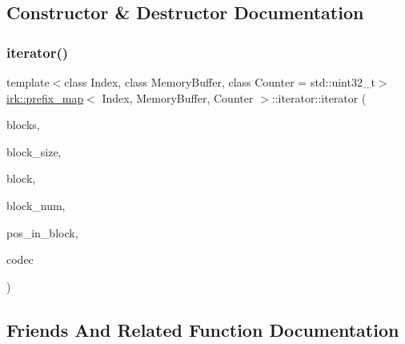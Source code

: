 \subsection{Constructor \& Destructor Documentation}
\mbox{\label{classirk_1_1prefix__map_1_1iterator_a5701dce183a096eb3c55cfd3d52c803b}} 
\subsubsection{\texorpdfstring{iterator()}{iterator()}}
{\footnotesize\ttfamily template$<$class Index, class Memory\+Buffer, class Counter = std\+::uint32\+\_\+t$>$ \\
\mbox{\hyperlink{classirk_1_1prefix__map}{irk\+::prefix\+\_\+map}}$<$ Index, Memory\+Buffer, Counter $>$\+::iterator\+::iterator (\begin{DoxyParamCaption}\item[{const Memory\+Buffer \&}]{blocks,  }\item[{int}]{block\+\_\+size,  }\item[{\mbox{\hyperlink{classirk_1_1prefix__map_1_1block__ptr}{block\+\_\+ptr}}}]{block,  }\item[{int}]{block\+\_\+num,  }\item[{int}]{pos\+\_\+in\+\_\+block,  }\item[{const std\+::shared\+\_\+ptr$<$ \mbox{\hyperlink{classirk_1_1hutucker__codec}{hutucker\+\_\+codec}}$<$ char $>$$>$}]{codec }\end{DoxyParamCaption})\hspace{0.3cm}{\ttfamily [inline]}}



\subsection{Friends And Related Function Documentation}
\mbox{\label{classirk_1_1prefix__map_1_1iterator_ac09f73e325921cc50ebcd96bed0f8096}} 
